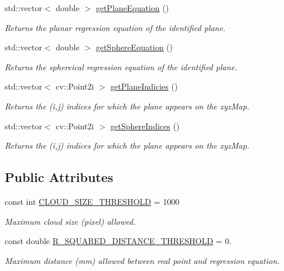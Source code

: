\begin{DoxyCompactItemize}
std\+::vector$<$ double $>$ \hyperlink{class_plane_aafedb091ba358d46d5203c4e0eb6e838}{get\+Plane\+Equation} ()
\begin{DoxyCompactList}\small\item\em Returns the planar regression equation of the identified plane. \end{DoxyCompactList}\item 
std\+::vector$<$ double $>$ \hyperlink{class_plane_ab82069a9be653b07a589374c03b2f436}{get\+Sphere\+Equation} ()
\begin{DoxyCompactList}\small\item\em Returns the sphereical regression equation of the identified plane. \end{DoxyCompactList}\item 
std\+::vector$<$ cv\+::\+Point2i $>$ \hyperlink{class_plane_a843717e035e2e6b4e03a8eece14098b1}{get\+Plane\+Indicies} ()
\begin{DoxyCompactList}\small\item\em Returns the (i,j) indices for which the plane appears on the xyz\+Map. \end{DoxyCompactList}\item 
std\+::vector$<$ cv\+::\+Point2i $>$ \hyperlink{class_plane_acd72c8d01f393ef78c4ed1f685d1d36d}{get\+Sphere\+Indices} ()
\begin{DoxyCompactList}\small\item\em Returns the (i,j) indices for which the plane appears on the xyz\+Map. \end{DoxyCompactList}\end{DoxyCompactItemize}
\subsection*{Public Attributes}
\begin{DoxyCompactItemize}
\item 
\hypertarget{class_plane_a1251f1df31bce7666494bfb6d069dd2e}{}\label{class_plane_a1251f1df31bce7666494bfb6d069dd2e} 
const int \hyperlink{class_plane_a1251f1df31bce7666494bfb6d069dd2e}{C\+L\+O\+U\+D\+\_\+\+S\+I\+Z\+E\+\_\+\+T\+H\+R\+E\+S\+H\+O\+LD} = 1000
\begin{DoxyCompactList}\small\item\em Maximum cloud size (pixel) allowed. \end{DoxyCompactList}\item 
\hypertarget{class_plane_ae0e9b28377ab03e577aa6588da269328}{}\label{class_plane_ae0e9b28377ab03e577aa6588da269328} 
const double \hyperlink{class_plane_ae0e9b28377ab03e577aa6588da269328}{R\+\_\+\+S\+Q\+U\+A\+R\+E\+D\+\_\+\+D\+I\+S\+T\+A\+N\+C\+E\+\_\+\+T\+H\+R\+E\+S\+H\+O\+LD} = 0.
\begin{DoxyCompactList}\small\item\em Maximum distance (mm) allowed between real point and regression equation. \end{DoxyCompactList}\end{DoxyCompactItemize}
